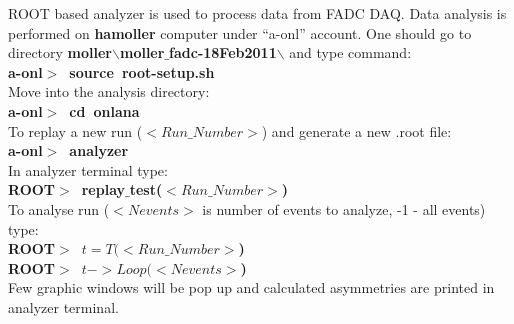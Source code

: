 {   ROOT\cite{ROOTcern} based analyzer is used to process data from FADC DAQ.
   Data analysis is performed on {\bf hamoller} computer under ``a-onl'' 
   account. One should go to directory 
   {\bf moller$\backslash$moller$\_$fadc-18Feb2011$\backslash$} 
   and type command: \\
   {\bf a-onl$>$~source~root-setup.sh} \\
   Move into the analysis directory: \\
   {\bf a-onl$>$~cd~onlana} \\
   To replay a new run ($<Run\_Number>$) and generate a new .root file: \\
   {\bf a-onl$>$~analyzer}  \\
   In analyzer terminal type: \\
   {\bf ROOT$>$~replay$\_$test($<Run\_Number>$)} \\
   To analyse run ($<Nevents>$ is number of events to analyze, -1 - all events)
   type: \\
   {\bf ROOT$>$~$t=T(<Run\_Number>$)} \\
   {\bf ROOT$>$~$t->Loop(<Nevents>$)} \\
   Few graphic windows will be pop up and calculated asymmetries are printed
   in analyzer terminal.

}
